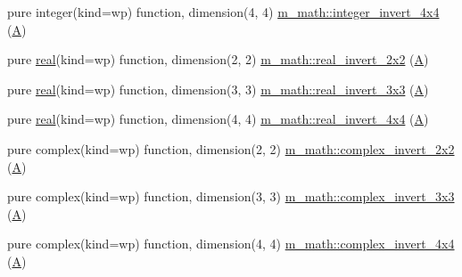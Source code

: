 \begin{DoxyCompactItemize}
pure integer(kind=wp) function, dimension(4, 4) \hyperlink{namespacem__math_a4bd503fea27968c6b3d7ab2a71509db7}{m\+\_\+math\+::integer\+\_\+invert\+\_\+4x4} (\hyperlink{ufpp__overview_81_8txt_a8341271e5f4e3003f6eb1c9547fc9d1a}{A})
\item 
pure \hyperlink{read__watch_83_8txt_abdb62bde002f38ef75f810d3a905a823}{real}(kind=wp) function, dimension(2, 2) \hyperlink{namespacem__math_aa8b68ce8fb1a10c992e769f2e042979e}{m\+\_\+math\+::real\+\_\+invert\+\_\+2x2} (\hyperlink{ufpp__overview_81_8txt_a8341271e5f4e3003f6eb1c9547fc9d1a}{A})
\item 
pure \hyperlink{read__watch_83_8txt_abdb62bde002f38ef75f810d3a905a823}{real}(kind=wp) function, dimension(3, 3) \hyperlink{namespacem__math_a79f32ff4d35916ca4422bb8ce0d30113}{m\+\_\+math\+::real\+\_\+invert\+\_\+3x3} (\hyperlink{ufpp__overview_81_8txt_a8341271e5f4e3003f6eb1c9547fc9d1a}{A})
\item 
pure \hyperlink{read__watch_83_8txt_abdb62bde002f38ef75f810d3a905a823}{real}(kind=wp) function, dimension(4, 4) \hyperlink{namespacem__math_a09e9433fe80e44fc0b63d815d2ee389a}{m\+\_\+math\+::real\+\_\+invert\+\_\+4x4} (\hyperlink{ufpp__overview_81_8txt_a8341271e5f4e3003f6eb1c9547fc9d1a}{A})
\item 
pure complex(kind=wp) function, dimension(2, 2) \hyperlink{namespacem__math_ae91471830acbe021ac273b72331bafd2}{m\+\_\+math\+::complex\+\_\+invert\+\_\+2x2} (\hyperlink{ufpp__overview_81_8txt_a8341271e5f4e3003f6eb1c9547fc9d1a}{A})
\item 
pure complex(kind=wp) function, dimension(3, 3) \hyperlink{namespacem__math_a09c8d8435741d02fc85dce5435a5630d}{m\+\_\+math\+::complex\+\_\+invert\+\_\+3x3} (\hyperlink{ufpp__overview_81_8txt_a8341271e5f4e3003f6eb1c9547fc9d1a}{A})
\item 
pure complex(kind=wp) function, dimension(4, 4) \hyperlink{namespacem__math_a8e3ef557757711b8ace73f51e44659a6}{m\+\_\+math\+::complex\+\_\+invert\+\_\+4x4} (\hyperlink{ufpp__overview_81_8txt_a8341271e5f4e3003f6eb1c9547fc9d1a}{A})
\end{DoxyCompactItemize}
